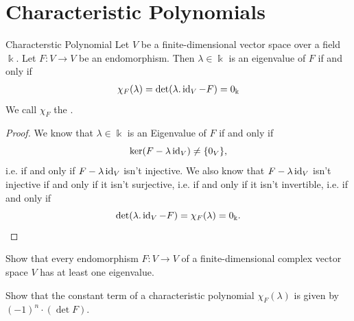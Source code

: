 \section{Characteristic Polynomials}
\begin{importanttheorem}{Characterstic Polynomial}{}
	Let $V$ be a finite-dimensional vector space over a field $\Bbbk$. Let $F : V \to V$ be an endomorphism. Then $\lambda \in \Bbbk$ is an eigenvalue of $F$ if and only if
	\begin{align*}
		\chi_F(\lambda) = \det(\lambda.\operatorname{id}_V - F) = 0_\Bbbk
	\end{align*}
	We call $\chi_F$ the .
\end{importanttheorem}
\begin{proof}
	We know that $\lambda \in \Bbbk$ is an Eigenvalue of $F$ if and only if $$\ker(F - \lambda \operatorname{id}_V) \neq \qty{0_V},$$ i.e. if and only if $F - \lambda \operatorname{id}_V$ isn't injective.
	\newpar
	We also know that $F - \lambda \operatorname{id}_V$ isn't injective if and only if it isn't surjective, i.e. if and only if it isn't invertible, i.e. if and only if $$\det(\lambda.\operatorname{id}_V - F) = \chi_F(\lambda) = 0_\Bbbk.$$
\end{proof}
\begin{exercise}
	Show that every endomorphism $F : V \to V$ of a finite-dimensional complex vector space $V$ has at least one eigenvalue.
\end{exercise}
\begin{exercise}
	Show that the constant term of a characteristic polynomial $\chi_F(\lambda)$ is given by $(-1)^n \cdot (\det F)$.
\end{exercise}
